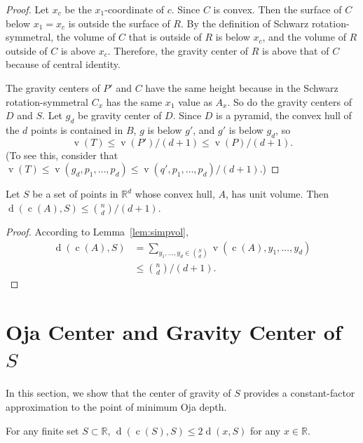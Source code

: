 \documentclass{cccg10}
\DeclareMathOperator{\od}{d}
\DeclareMathOperator{\vol}{v}
\DeclareMathOperator{\cog}{c}
\newcommand{\R}{\mathbb{R}}
\begin{document}
\begin{proof}
Let $x_{c}$ be the $x_{1}$-coordinate of $c$. Since
$C$ is convex. Then the surface of $C$ below
$x_{1} = x_{c}$ is outside the surface of $R$. By the definition of
Schwarz rotation-symmetral, the volume of $C$ that is outside of
$R$ is below $x_{c}$, and the volume of $R$ outside of $C$ is above
$x_{c}$. Therefore, the gravity center of $R$ is above that of $C$
because of central identity.

The gravity centers of $P'$ and $C$ have the same height because in the
Schwarz rotation-symmetral $C_{x}$ has the same $x_{1}$ value as $A_{x}$.
So do the gravity centers of $D$ and $S$. Let $g_{d}$ be gravity center of
$D$. Since $D$ is a pyramid, the convex hull of the $d$ points is contained
in $B$,  $g$ is below $g'$, and $g'$ is below $g_{d}$, so 
\[ \vol(T) \leq \vol(P')/(d+1) \leq \vol(P)/(d+1).\]
(To see this, consider that $\vol(T)\le\vol(g_d,p_1,\ldots,p_d)\le \vol(q',p_1,\ldots,p_d)/(d+1)$.)
\end{proof}

\begin{theorem}
  \label{thm:ndcenter}
  Let $S$ be a set of points in $\R^d$ whose convex hull, $A$, has unit volume. Then $\od(\cog(A),S)\le \binom{n}{d}/(d+1)$.
\end{theorem}

\begin{proof}
  According to Lemma~\ref{lem:simpvol},
  \[
    \begin{aligned}
     \od(\cog(A), S) 
      & = \sum_{y_{1},\ldots , y_{d} \in \binom{S}{d}} \vol(\cog(A), y_{1}, \ldots,
y_{d}) \\
      & \leq \binom{n}{d}/(d+1). 
    \end{aligned} \]
\end{proof}

\section{Oja Center and Gravity Center of $S$}
\label{sec:cnterofS}

In this section, we show that the center of gravity of $S$ provides a
constant-factor approximation to the point of minimum Oja depth.

\begin{theorem}
\label{thm:grav1d}
For any finite set $S\subset\mathbb{R}$, $\od(\cog(S),S) \le 2\od(x,S)$ for
any $x\in\mathbb{R}$.
\end{theorem}
\end{document}
